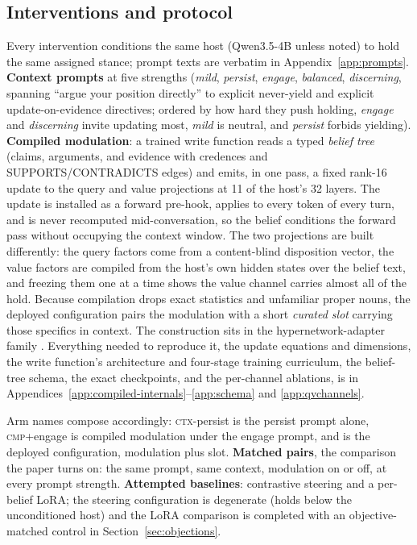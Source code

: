 \subsection{Interventions and protocol}
\label{sec:design-interventions}
Every intervention conditions the same host (Qwen3.5-4B unless noted) to hold the same assigned
stance; prompt texts are verbatim in Appendix~\ref{app:prompts}. \textbf{Context prompts} at
five strengths (\emph{mild}, \emph{persist}, \emph{engage}, \emph{balanced},
\emph{discerning}, spanning ``argue your position directly'' to explicit never-yield and
explicit update-on-evidence directives; ordered by how hard they push holding, \emph{engage}
and \emph{discerning} invite updating most, \emph{mild} is neutral, and \emph{persist}
forbids yielding). \textbf{Compiled modulation}: a trained write function reads a typed
\emph{belief tree} (claims, arguments, and evidence with credences and SUPPORTS/CONTRADICTS
edges) and emits, in one pass, a fixed rank-16 update to the query and value projections at 11
of the host's 32 layers. The update is installed as a forward pre-hook, applies to every token
of every turn, and is never recomputed mid-conversation, so the belief conditions the forward
pass without occupying the context window. The two projections are built differently: the query
factors come from a content-blind disposition vector, the value factors are compiled from the
host's own hidden states over the belief text, and freezing them one at a time shows the value
channel carries almost all of the hold. Because compilation drops exact statistics and
unfamiliar proper nouns, the deployed configuration pairs the modulation with a short
\emph{curated slot} carrying those specifics in context. The construction sits in the
hypernetwork-adapter family
\citep{chen2025generativeadapter,charakorn2025texttolora,perez1970film}. Everything needed to
reproduce it, the update equations and dimensions, the write function's architecture and
four-stage training curriculum, the belief-tree schema, the exact checkpoints, and the
per-channel ablations, is in Appendices~\ref{app:compiled-internals}--\ref{app:schema} and
\ref{app:qvchannels}.

Arm names compose accordingly: \textsc{ctx}-persist is the persist prompt alone,
\textsc{cmp}+engage is compiled modulation under the engage prompt, and \condF{} is the
deployed configuration, modulation plus slot. \textbf{Matched pairs}, the comparison the paper turns
on: the same prompt, same context, modulation on or off, at every prompt strength.
\textbf{Attempted baselines}: contrastive steering \citep{rimsky2024caa} and a per-belief LoRA;
the steering configuration is degenerate (holds below the unconditioned host) and the LoRA comparison is completed with an objective-matched control in
Section~\ref{sec:objections}.

